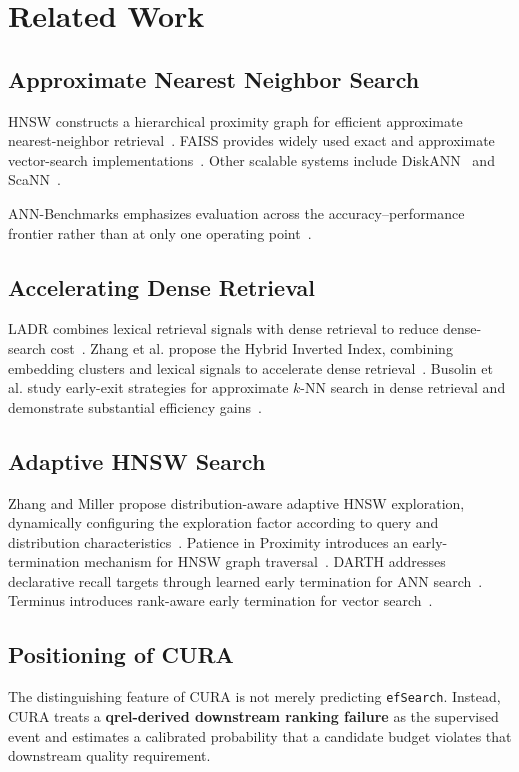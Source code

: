 \documentclass[10pt,twocolumn]{article}
\newcommand{\cura}{CURA}
\newcommand{\ef}{\texttt{efSearch}}
\begin{document}
\section{Related Work}
\label{sec:related}
\subsection{Approximate Nearest Neighbor Search}
HNSW constructs a hierarchical proximity graph for efficient approximate nearest-neighbor retrieval~\citep{malkov2020hnsw}. FAISS provides widely used exact and approximate vector-search implementations~\citep{johnson2017faiss}. Other scalable systems include DiskANN~\citep{subramanya2019diskann} and ScaNN~\citep{guo2020scann}.

ANN-Benchmarks emphasizes evaluation across the accuracy--performance frontier rather than at only one operating point~\citep{aumuller2020ann}.

\subsection{Accelerating Dense Retrieval}
LADR combines lexical retrieval signals with dense retrieval to reduce dense-search cost~\citep{kulkarni2023ladr}. Zhang et al. propose the Hybrid Inverted Index, combining embedding clusters and lexical signals to accelerate dense retrieval~\citep{zhang2023hybrid}. Busolin et al. study early-exit strategies for approximate $k$-NN search in dense retrieval and demonstrate substantial efficiency gains~\citep{busolin2024early}.

\subsection{Adaptive HNSW Search}
Zhang and Miller propose distribution-aware adaptive HNSW exploration, dynamically configuring the exploration factor according to query and distribution characteristics~\citep{zhang2026adaptive}. Patience in Proximity introduces an early-termination mechanism for HNSW graph traversal~\citep{teofili2025patience}. DARTH addresses declarative recall targets through learned early termination for ANN search~\citep{chatzakis2026darth}. Terminus introduces rank-aware early termination for vector search~\citep{lu2026terminus}.

\subsection{Positioning of CURA}
The distinguishing feature of \cura{} is not merely predicting \ef{}. Instead, \cura{} treats a \textbf{qrel-derived downstream ranking failure} as the supervised event and estimates a calibrated probability that a candidate budget violates that downstream quality requirement.
\end{document}
